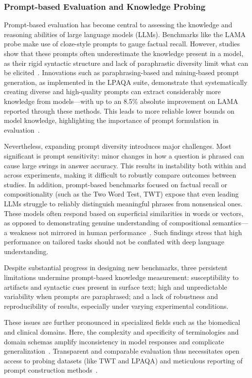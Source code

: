 \documentclass[sigconf]{acmart}
\begin{document}
\subsubsection{Prompt-based Evaluation and Knowledge Probing}

Prompt-based evaluation has become central to assessing the knowledge and reasoning abilities of large language models (LLMs). Benchmarks like the LAMA probe make use of cloze-style prompts to gauge factual recall. However, studies show that these prompts often underestimate the knowledge present in a model, as their rigid syntactic structure and lack of paraphrastic diversity limit what can be elicited~\cite{ref98}. Innovations such as paraphrasing-based and mining-based prompt generation, as implemented in the LPAQA suite, demonstrate that systematically creating diverse and high-quality prompts can extract considerably more knowledge from models---with up to an 8.5\% absolute improvement on LAMA reported through these methods. This leads to more reliable lower bounds on model knowledge, highlighting the importance of prompt formulation in evaluation~\cite{ref98}.

Nevertheless, expanding prompt diversity introduces major challenges. Most significant is prompt sensitivity: minor changes in how a question is phrased can cause large swings in answer accuracy. This results in instability both within and across experiments, making it difficult to robustly compare outcomes between studies. In addition, prompt-based benchmarks focused on factual recall or compositionality (such as the Two Word Test, TWT) expose that even leading LLMs struggle to reliably distinguish meaningful phrases from nonsensical ones. These models often respond based on superficial similarities in words or vectors, as opposed to demonstrating genuine understanding of compositional semantics---a weakness not mirrored in human performance~\cite{ref96}. Such findings stress that high performance on tailored tasks should not be conflated with deep language understanding.

Despite substantial progress in designing new benchmarks, three persistent limitations undermine prompt-based knowledge measurement: susceptibility to artifacts and syntactic cues present in surface text; high and unpredictable variability when prompts are paraphrased; and a lack of robustness and reproducibility of results, especially under varying experimental conditions.

These issues are further pronounced in specialized fields such as the biomedical and clinical domains. Here, the complexity and specificity of terminologies and domain schemas amplify inconsistency in model responses and complicate generalization~\cite{ref94,ref95}. Transparent and comparable evaluation thus necessitates open access to probing datasets (like TWT and LPAQA) and meticulous reporting of prompt construction methods~\cite{ref96,ref98}.
\end{document}
